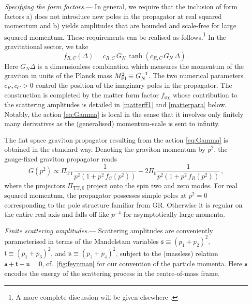 \documentclass[aps,prl,reprint,twocolumn,superscriptaddress,longbibliography,nofootinbib,floatfix,showpacs]{revtex4-1}
\newcommand{\GR}{{\small GR}}
\newcommand{\mans}{\ensuremath{\mathfrak{s}}}
\newcommand{\mant}{\ensuremath{\mathfrak{t}}}
\newcommand{\manu}{\ensuremath{\mathfrak{u}}}
\begin{document}
\textit{Specifying the form factors.}---
In general, we require that the inclusion of form factors a) does not introduce new poles in the propagator at real squared momentum and b) yields amplitudes that are bounded and scale-free for large squared momentum.
These requirements can be realised as follows.\footnote{A more complete discussion will be given elsewhere \cite{Draper:2020knh}.} 
In the gravitational sector, we take
%
\begin{equation}\label{infiniteres}
				f_{R,C}(\Delta)
		=
				c_{R,C} \, G_N	\, \tanh \left(	c_{R,C} \,	G_N	\, \Delta	\right)
		\, .
\end{equation}
%
Here $G_N \Delta$ is a dimensionless combination which measures the momentum of the graviton in units of the Planck mass $M_{\rm Pl}^2 \equiv G_N^{-1}$.
The two numerical parameters $c_{R}, c_{C} > 0$ control the position of the imaginary poles in the propagator.
The construction is completed by the matter form factor $f_{\phi\chi}$ whose contribution to the scattering amplitudes is detailed in \eqref{matterff1} and \eqref{matterpara} below.
Notably, the action \eqref{eq:Gamma} is local in the sense that it involves only finitely many derivatives as the (generalised) momentum-scale is sent to infinity.

The flat space graviton propagator resulting from the action \eqref{eq:Gamma} is obtained in the standard way.
Denoting the graviton momentum by $p^2$, the gauge-fixed graviton propagator reads
%
\begin{equation}\label{IRMprop}
 G(p^2) \propto \Pi_\text{TT} \frac{1}{p^2(1+p^2 \, f_C(p^2))} -2 \Pi_0 \frac{1}{p^2(1+p^2 \, f_R(p^2))} \, ,
\end{equation}
%
where the projectors $\Pi_{\text{TT},0}$ project onto the spin two and zero modes.
For real squared momentum, the propagator possesses simple poles at $p^2 = 0$ corresponding to the pole structure familiar from \GR{}.
Otherwise it is regular on the entire real axis and falls off like $p^{-4}$ for asymptotically large momenta.


\textit{Finite scattering amplitudes.}--- Scattering amplitudes are conveniently parameterised in terms of the Mandelstam variables $\mans \equiv (p_1 + p_2)^2$, $\mant \equiv (p_1 + p_3)^2$, and $\manu \equiv (p_1 + p_4)^2$, subject to the (massless) relation $\mans + \mant + \manu = 0$, cf.\ \autoref{fig:feynman} for our convention of the particle momenta.
Here $\mans$ encodes the energy of the scattering process in the centre-of-mass frame.  
\end{document}
